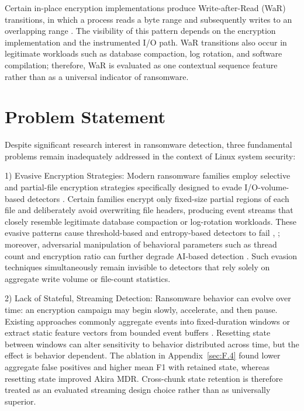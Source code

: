 Certain in-place encryption implementations produce Write-after-Read (WaR) transitions, in which a process reads a byte range and subsequently writes to an overlapping range \cite{ref9}. The visibility of this pattern depends on the encryption implementation and the instrumented I/\allowbreak{}O path. WaR transitions also occur in legitimate workloads such as database compaction, log rotation, and software compilation; therefore, WaR is evaluated as one contextual sequence feature rather than as a universal indicator of ransomware.

\section{Problem Statement}\label{sec:1.2}

Despite significant research interest in ransomware detection, three fundamental problems remain inadequately addressed in the context of Linux system security:

1) Evasive Encryption Strategies:  Modern ransomware families employ selective and partial-file encryption strategies specifically designed to evade I/\allowbreak{}O-volume-based detectors \cite{ref15}. Certain families encrypt only fixed-size partial regions of each file and deliberately avoid overwriting file headers, producing event streams that closely resemble legitimate database compaction or log-rotation workloads. These evasive patterns cause threshold-based and entropy-based detectors to fail \cite{ref13}, \cite{ref14}; moreover, adversarial manipulation of behavioral parameters such as thread count and encryption ratio can further degrade AI-based detection \cite{ref8}. Such evasion techniques simultaneously remain invisible to detectors that rely solely on aggregate write volume or file-count statistics.

2) Lack of Stateful, Streaming Detection:  Ransomware behavior can evolve over time: an encryption campaign may begin slowly, accelerate, and then pause. Existing approaches commonly aggregate events into fixed-duration windows or extract static feature vectors from bounded event buffers \cite{ref16}. Resetting state between windows can alter sensitivity to behavior distributed across time, but the effect is behavior dependent. The ablation in Appendix~\ref{sec:F.4} found lower aggregate false positives and higher mean F1 with retained state, whereas resetting state improved Akira MDR. Cross-chunk state retention is therefore treated as an evaluated streaming design choice rather than as universally superior.

